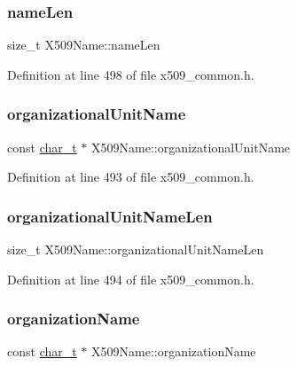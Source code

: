 \subsubsection{\texorpdfstring{name\+Len}{nameLen}}
{\footnotesize\ttfamily size\+\_\+t X509\+Name\+::name\+Len}



Definition at line 498 of file x509\+\_\+common.\+h.

\mbox{\label{structX509Name_a4095d2020e8553687a85b462fd00eac9}} 
\subsubsection{\texorpdfstring{organizational\+Unit\+Name}{organizationalUnitName}}
{\footnotesize\ttfamily const \hyperlink{compiler__port_8h_a40bb5262bf908c328fbcfbe5d29d0201}{char\+\_\+t} $\ast$ X509\+Name\+::organizational\+Unit\+Name}



Definition at line 493 of file x509\+\_\+common.\+h.

\mbox{\label{structX509Name_a17dc575cf29d256e44331bcb05ea67f0}} 
\subsubsection{\texorpdfstring{organizational\+Unit\+Name\+Len}{organizationalUnitNameLen}}
{\footnotesize\ttfamily size\+\_\+t X509\+Name\+::organizational\+Unit\+Name\+Len}



Definition at line 494 of file x509\+\_\+common.\+h.

\mbox{\label{structX509Name_a521dfa010d25113b7ebca412a8ef1b6b}} 
\subsubsection{\texorpdfstring{organization\+Name}{organizationName}}
{\footnotesize\ttfamily const \hyperlink{compiler__port_8h_a40bb5262bf908c328fbcfbe5d29d0201}{char\+\_\+t} $\ast$ X509\+Name\+::organization\+Name}



